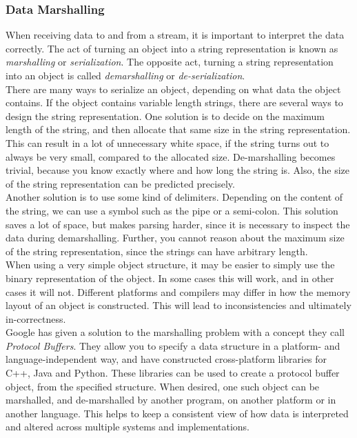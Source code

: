 \documentclass[a4paper]{article}
\begin{document}
\subsubsection{Data Marshalling}
When receiving data to and from a stream, it is important to interpret the data correctly. The act of turning an object into a string representation is known as \textit{marshalling} or \textit{serialization}. The opposite act, turning a string representation into an object is called \textit{demarshalling} or \textit{de-serialization}.\\

There are many ways to serialize an object, depending on what data the object contains. If the object contains variable length strings, there are several ways to design the string representation. One solution is to decide on the maximum length of the string, and then allocate that same size in the string representation. This can result in a lot of unnecessary white space, if the string turns out to always be very small, compared to the allocated size. De-marshalling becomes trivial, because you know exactly where and how long the string is. Also, the size of the string representation can be predicted precisely.\\

Another solution is to use some kind of delimiters. Depending on the content of the string, we can use a symbol such as the pipe or a semi-colon. This solution saves a lot of space, but makes parsing harder, since it is necessary to inspect the data during demarshalling. Further, you cannot reason about the maximum size of the string representation, since the strings can have arbitrary length.\\

When using a very simple object structure, it may be easier to simply use the binary representation of the object. In some cases this will work, and in other cases it will not. Different platforms and compilers may differ in how the memory layout of an object is constructed. This will lead to inconsistencies and ultimately in-correctness.\\

Google has given a solution to the marshalling problem with a concept they call \textit{Protocol Buffers}\cite{protobuf}. They allow you to specify a data structure in a platform- and language-independent way, and have constructed cross-platform libraries for C++, Java and Python. These libraries can be used to create a protocol buffer object, from the specified structure. When desired, one such object can be marshalled, and de-marshalled by another program, on another platform or in another language. This helps to keep a consistent view of how data is interpreted and altered across multiple systems and implementations.
\end{document}
